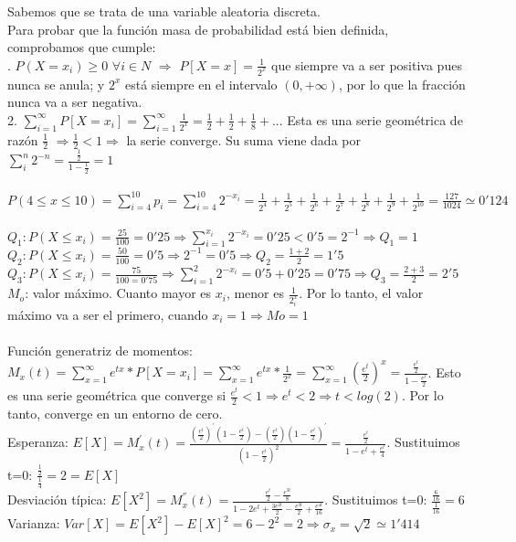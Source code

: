 Sabemos que se trata de una variable aleatoria discreta. \\
Para probar que la función masa de probabilidad está bien definida, comprobamos que cumple: \\
. $P(X=x_i)\geq 0$ $\forall i\in N$ $\Rightarrow$ $P[X=x]=\frac{1}{2^x}$ que siempre va a ser positiva pues nunca se anula; y $2^x$ está siempre en el intervalo $(0,+\infty)$, por lo que la fracción nunca va a ser negativa. \\
2. $\sum_{i=1}^{\infty}P[X=x_i]=\sum_{i=1}^{\infty}\frac{1}{2^x} = \frac{1}{2} + \frac{1}{2} + \frac{1}{8} + ... $ Esta es una serie geométrica de razón $\frac{1}{2}$ $\Rightarrow \frac{1}{2} < 1 \Rightarrow$ la serie converge. Su suma viene dada por $\sum_{i}^n 2^{-n} = \frac{\frac{1}{2}}{1-\frac{1}{2}}=1$ \\ \\
\subproblem
$P(4\leq x \leq 10) = \sum^{10}_{i=4} p_i = \sum^{10}_{i=4} 2^{-x_i} = \frac{1}{2^4}+\frac{1}{2^5}+ \frac{1}{2^6} + \frac{1}{2^7} + \frac{1}{2^8} + \frac{1}{2^9}+ \frac{1}{2^{10}} = \frac{127}{1024} \simeq 0'124$ \\ \\
\subproblem
$Q_1: P(X\leq x_i) = \frac{25}{100} = 0'25 \Rightarrow \sum^{x_i}_{i=1} 2^{-x_i} = 0'25 < 0'5 = 2^{-1} \Rightarrow Q_1 = 1$ \\
$Q_2: P(X \leq x_i) = \frac{50}{100} = 0'5 \Rightarrow 2^{-1} = 0'5 \Rightarrow Q_2 = \frac{1+2}{2} = 1'5$ \\
$Q_3: P(X \leq x_i) = \frac{75}{100 = 0'75} \Rightarrow \sum^2_{i=1} 2^{-x_i} = 0'5 + 0'25 = 0'75 \Rightarrow Q_3 = \frac{2+3}{2} = 2'5$ \\
$M_o$: valor máximo. Cuanto mayor es $x_i$, menor es $\frac{1}{2^x_i}$. Por lo tanto, el valor máximo va a ser el primero, cuando $x_i = 1 \Rightarrow Mo = 1$ \\ \\
\subproblem
Función generatriz de momentos: $M_x(t) = \sum^\infty_{x=1} e^{tx}*P[X=x_i] = \sum^\infty_{x=1} e^{tx}*\frac{1}{2^x} = \sum^\infty_{x=1} (\frac{e^t}{2})^x = \frac{\frac{e^t}{2}}{1-\frac{e^t}{2}}$. Esto es una serie geométrica que converge si $\frac{e^t}{2} < 1 \Rightarrow e^t < 2 \Rightarrow t < log(2)$. Por lo tanto, converge en un entorno de cero. \\
Esperanza: $E[X] = M^{'} _x(t) = \frac{(\frac{e^t}{2})^{'}(1-\frac{e^t}{2})-(\frac{e^t}{2})(1-\frac{e^t}{2})^{'}}{(1-\frac{e^t}{2})^2} = \frac{\frac{e^t}{2}}{1 - e^t + \frac{e^t}{4}}$. Sustituimos t=0: $\frac{\frac{1}{2}}{\frac{1}{4}} = 2 = E[X]$ \\
Desviación típica: $E[X^2] = M^{''}_x(t) = \frac{\frac{e^t}{2}-\frac{e^{3t}}{8}}{1-2e^t+\frac{3e^{2t}}{2}-\frac{e^{3t}}{2}+\frac{e^{4t}}{16}}$. Sustituimos t=0: $\frac{\frac{6}{16}}{\frac{1}{16}} = 6$ \\
Varianza: $Var[X] = E[X^2]-E[X]^2 = 6-2^2 = 2 \Rightarrow \sigma_x = \sqrt{2} \simeq 1'414$

